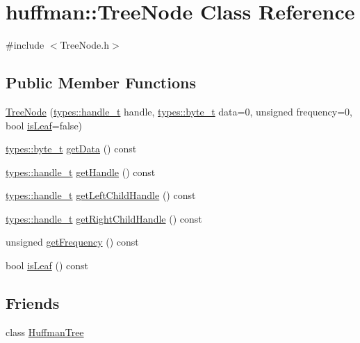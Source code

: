 \hypertarget{classhuffman_1_1TreeNode}{}\section{huffman\+:\+:Tree\+Node Class Reference}
\label{classhuffman_1_1TreeNode}


{\ttfamily \#include $<$Tree\+Node.\+h$>$}

\subsection*{Public Member Functions}
\begin{DoxyCompactItemize}
\item 
\hyperlink{classhuffman_1_1TreeNode_a646d0926ef89e40457ecc763ed72b2b3}{Tree\+Node} (\hyperlink{namespacehuffman_1_1types_a41dc8ca07e19043152b0a5c8b5fec90b}{types\+::handle\+\_\+t} handle, \hyperlink{namespacehuffman_1_1types_a198fb2bbef1012ab1696124836c56f0d}{types\+::byte\+\_\+t} data=0, unsigned frequency=0, bool \hyperlink{classhuffman_1_1TreeNode_ae7f4f2f80c14fd5a75324ade5011c422}{is\+Leaf}=false)
\item 
\hyperlink{namespacehuffman_1_1types_a198fb2bbef1012ab1696124836c56f0d}{types\+::byte\+\_\+t} \hyperlink{classhuffman_1_1TreeNode_a3f873c80f09c1687024e93db059df7f9}{get\+Data} () const 
\item 
\hyperlink{namespacehuffman_1_1types_a41dc8ca07e19043152b0a5c8b5fec90b}{types\+::handle\+\_\+t} \hyperlink{classhuffman_1_1TreeNode_a1dd4d1c1f488a4456aff71bd88186504}{get\+Handle} () const 
\item 
\hyperlink{namespacehuffman_1_1types_a41dc8ca07e19043152b0a5c8b5fec90b}{types\+::handle\+\_\+t} \hyperlink{classhuffman_1_1TreeNode_ac3b06247d549478cd6ddefaa07bac996}{get\+Left\+Child\+Handle} () const 
\item 
\hyperlink{namespacehuffman_1_1types_a41dc8ca07e19043152b0a5c8b5fec90b}{types\+::handle\+\_\+t} \hyperlink{classhuffman_1_1TreeNode_a660cb585c478d66e2b1e7f601689bfdd}{get\+Right\+Child\+Handle} () const 
\item 
unsigned \hyperlink{classhuffman_1_1TreeNode_a8de84d3587bcd650528c4db96621a802}{get\+Frequency} () const 
\item 
bool \hyperlink{classhuffman_1_1TreeNode_ae7f4f2f80c14fd5a75324ade5011c422}{is\+Leaf} () const 
\end{DoxyCompactItemize}
\subsection*{Friends}
\begin{DoxyCompactItemize}
\item 
class \hyperlink{classhuffman_1_1TreeNode_a062a9593db748950f1e31d49fd2cae41}{Huffman\+Tree}
\end{DoxyCompactItemize}


